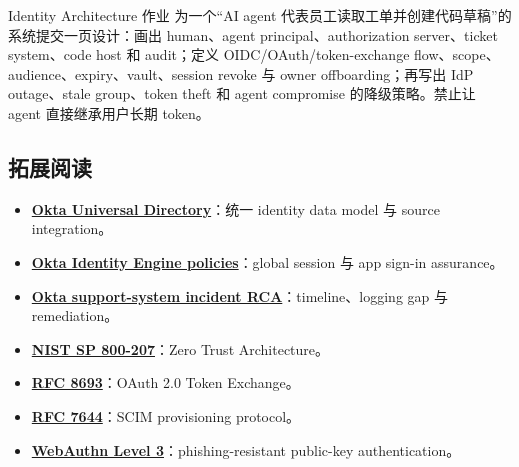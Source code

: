 \documentclass[a4paper]{article}
\begin{document}
\begin{importantbox}{Identity Architecture 作业}
为一个“AI agent 代表员工读取工单并创建代码草稿”的系统提交一页设计：画出 human、agent principal、authorization server、ticket system、code host 和 audit；定义 OIDC/OAuth/token-exchange flow、scope、audience、expiry、vault、session revoke 与 owner offboarding；再写出 IdP outage、stale group、token theft 和 agent compromise 的降级策略。禁止让 agent 直接继承用户长期 token。
\end{importantbox}

\subsection{拓展阅读}

{\small
\begin{itemize}[nosep,leftmargin=*]
  \item \href{https://developer.okta.com/docs/concepts/universal-directory/}{\textbf{Okta Universal Directory}}：统一 identity data model 与 source integration。
  \item \href{https://help.okta.com/oie/en-us/content/topics/identity-engine/policies/about-policies.htm}{\textbf{Okta Identity Engine policies}}：global session 与 app sign-in assurance。
  \item \href{https://sec.okta.com/articles/2023/11/unauthorized-access-oktas-support-case-management-system-root-cause/}{\textbf{Okta support-system incident RCA}}：timeline、logging gap 与 remediation。
  \item \href{https://csrc.nist.gov/pubs/sp/800/207/final}{\textbf{NIST SP 800-207}}：Zero Trust Architecture。
  \item \href{https://www.rfc-editor.org/rfc/rfc8693}{\textbf{RFC 8693}}：OAuth 2.0 Token Exchange。
  \item \href{https://www.rfc-editor.org/rfc/rfc7644}{\textbf{RFC 7644}}：SCIM provisioning protocol。
  \item \href{https://www.w3.org/TR/webauthn-3/}{\textbf{WebAuthn Level 3}}：phishing-resistant public-key authentication。
\end{itemize}
}
\end{document}
